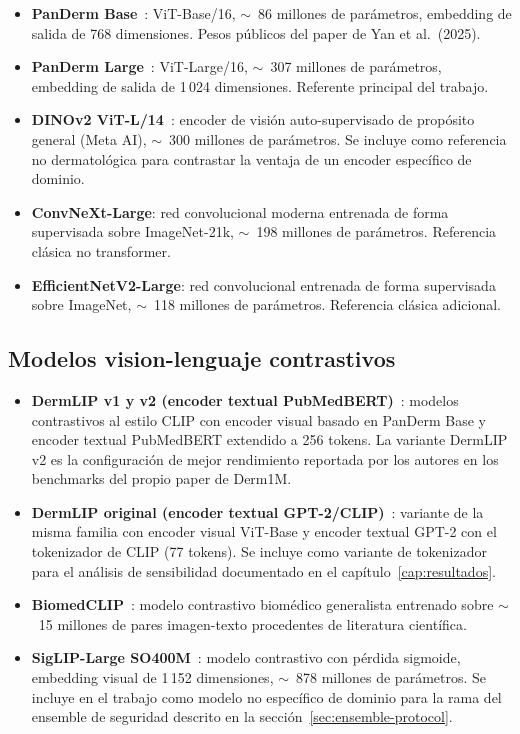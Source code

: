 \begin{itemize}
\item \textbf{PanDerm Base}~\cite{panderm2025}: ViT-Base/16,
$\sim$~86 millones de parámetros, embedding de salida de 768
dimensiones. Pesos públicos del paper de Yan et al.~(2025).

\item \textbf{PanDerm Large}~\cite{panderm2025}: ViT-Large/16,
$\sim$~307 millones de parámetros, embedding de salida de 1\,024
dimensiones. Referente principal del trabajo.

\item \textbf{DINOv2 ViT-L/14}~\cite{dinov2}: encoder de visión
auto-supervisado de propósito general (Meta AI), $\sim$~300
millones de parámetros. Se incluye como referencia no dermatológica
para contrastar la ventaja de un encoder específico de dominio.

\item \textbf{ConvNeXt-Large}: red convolucional moderna entrenada
de forma supervisada sobre ImageNet-21k, $\sim$~198 millones de
parámetros. Referencia clásica no transformer.

\item \textbf{EfficientNetV2-Large}: red convolucional entrenada de
forma supervisada sobre ImageNet, $\sim$~118 millones de parámetros.
Referencia clásica adicional.
\end{itemize}

\subsection{Modelos vision-lenguaje contrastivos}
\label{sec:modelos-vl}

\begin{itemize}
\item \textbf{DermLIP v1 y v2 (encoder textual PubMedBERT)}~\cite{derm1m}: modelos contrastivos al estilo CLIP con
encoder visual basado en PanDerm Base y encoder textual PubMedBERT
extendido a 256 tokens. La variante DermLIP v2 es la configuración
de mejor rendimiento reportada por los autores en los benchmarks
del propio paper de Derm1M.

\item \textbf{DermLIP original (encoder textual GPT-2/CLIP)}~\cite{derm1m}: variante de la misma familia con encoder visual
ViT-Base y encoder textual GPT-2 con el tokenizador de CLIP (77
tokens). Se incluye como variante de tokenizador para el análisis
de sensibilidad documentado en el capítulo~\ref{cap:resultados}.

\item \textbf{BiomedCLIP}~\cite{biomedclip}: modelo contrastivo
biomédico generalista entrenado sobre $\sim$~15 millones de pares
imagen-texto procedentes de literatura científica.

\item \textbf{SigLIP-Large SO400M}~\cite{siglip2023}: modelo
contrastivo con pérdida sigmoide, embedding visual de 1\,152
dimensiones, $\sim$~878 millones de parámetros. Se incluye en el
trabajo como modelo no específico de dominio para la rama del
ensemble de seguridad descrito en la
sección~\ref{sec:ensemble-protocol}.
\end{itemize}

